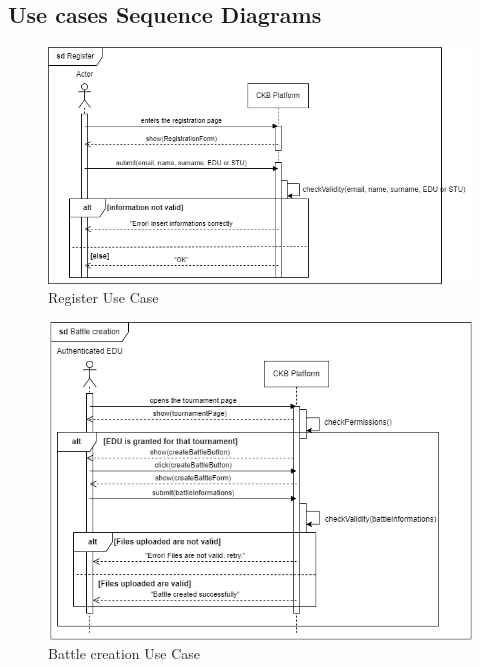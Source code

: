 \subsection{Use cases Sequence Diagrams}
    \begin{figure}[H]
        \centering
        \includegraphics[width=1\textwidth]{images/sequence_diagrams/ClassDiagram-UC1 -SequenceDiagram.png}
        \caption{Register Use Case}
        \label{fig:uc1}
    \end{figure}
    \begin{figure}[H]
        \centering
        \includegraphics[width=1\textwidth]{images/sequence_diagrams/ClassDiagram-UC4- SequenceDiagram.png}
        \caption{Battle creation Use Case}
        \label{fig:uc4}
    \end{figure}
